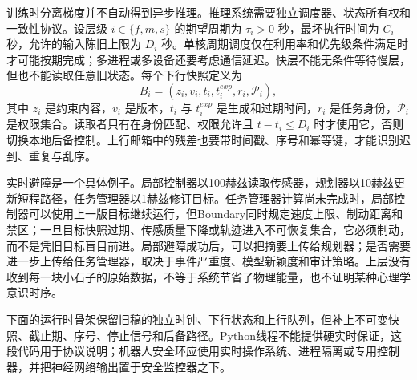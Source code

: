 训练时分离梯度并不自动得到异步推理。推理系统需要独立调度器、状态所有权和一致性协议。设层级 $i\in\{f,m,s\}$ 的期望周期为 $\tau_i>0$ 秒，最坏执行时间为 $C_i$ 秒，允许的输入陈旧上限为 $D_i$ 秒。单核周期调度仅在利用率和优先级条件满足时才可能按期完成；多进程或多设备还要考虑通信延迟。快层不能无条件等待慢层，但也不能读取任意旧状态。每个下行快照定义为
\begin{equation}
 B_i=(z_i,v_i,t_i,t_i^{exp},r_i,\mathcal P_i),
\end{equation}
其中 $z_i$ 是约束内容，$v_i$ 是版本，$t_i$ 与 $t_i^{exp}$ 是生成和过期时间，$r_i$ 是任务身份，$\mathcal P_i$ 是权限集合。读取者只有在身份匹配、权限允许且 $t-t_i\leq D_i$ 时才使用它，否则切换本地后备控制。上行邮箱中的残差也要带时间戳、序号和幂等键，才能识别迟到、重复与乱序。

实时避障是一个具体例子。局部控制器以100赫兹读取传感器，规划器以10赫兹更新短程路径，任务管理器以1赫兹修订目标。任务管理器计算尚未完成时，局部控制器可以使用上一版目标继续运行，但Boundary同时规定速度上限、制动距离和禁区；一旦目标快照过期、传感质量下降或轨迹进入不可恢复集合，它必须制动，而不是凭旧目标盲目前进。局部避障成功后，可以把摘要上传给规划器；是否需要进一步上传给任务管理器，取决于事件严重度、模型新颖度和审计策略。上层没有收到每一块小石子的原始数据，不等于系统节省了物理能量，也不证明某种心理学意识时序。

下面的运行时骨架保留旧稿的独立时钟、下行状态和上行队列，但补上不可变快照、截止期、序号、停止信号和后备路径。Python线程不能提供硬实时保证，这段代码用于协议说明；机器人安全环应使用实时操作系统、进程隔离或专用控制器，并把神经网络输出置于安全监控器之下。

